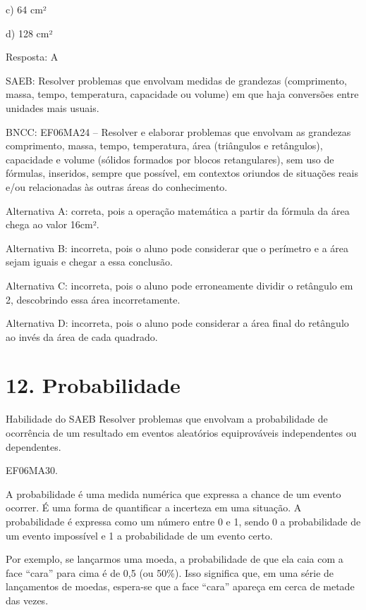c) 64 cm²

d) 128 cm²

Resposta: A

SAEB: Resolver problemas que envolvam medidas de grandezas (comprimento,
massa, tempo, temperatura, capacidade ou volume) em que haja conversões
entre unidades mais usuais.

BNCC: EF06MA24 -- Resolver e elaborar problemas que envolvam as
grandezas comprimento, massa, tempo, temperatura, área (triângulos e
retângulos), capacidade e volume (sólidos formados por blocos
retangulares), sem uso de fórmulas, inseridos, sempre que possível, em
contextos oriundos de situações reais e/ou relacionadas às outras áreas
do conhecimento.

Alternativa A: correta, pois a operação matemática a partir da fórmula
da área chega ao valor 16cm².

Alternativa B: incorreta, pois o aluno pode considerar que o perímetro e
a área sejam iguais e chegar a essa conclusão.

Alternativa C: incorreta, pois o aluno pode erroneamente dividir o
retângulo em 2, descobrindo essa área incorretamente.

Alternativa D: incorreta, pois o aluno pode considerar a área final do
retângulo ao invés da área de cada quadrado.

\chapter{12. Probabilidade}

Habilidade do SAEB Resolver problemas que envolvam a probabilidade de
ocorrência de um resultado em eventos aleatórios equiprováveis
independentes ou dependentes.


\begin{itemize}
EF06MA30.
\end{itemize}

A probabilidade é uma medida numérica que expressa a chance de um evento
ocorrer. É uma forma de quantificar a incerteza em uma situação. A
probabilidade é expressa como um número entre 0 e 1, sendo 0 a
probabilidade de um evento impossível e 1 a probabilidade de um evento
certo.

Por exemplo, se lançarmos uma moeda, a probabilidade de que ela caia com
a face ``cara'' para cima é de 0,5 (ou 50\%). Isso significa que, em uma
série de lançamentos de moedas, espera-se que a face ``cara'' apareça em
cerca de metade das vezes.

